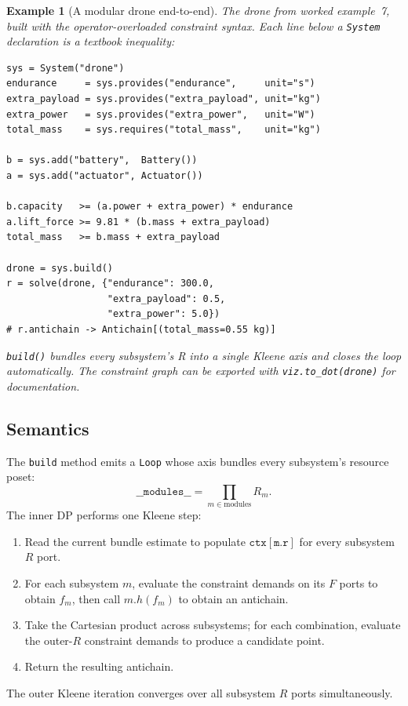 \documentclass[11pt,a4paper]{article}
\newtheorem{example}[definition]{Example}
\begin{document}
\begin{example}[A modular drone end-to-end]
The drone from worked example~7, built with the operator-overloaded
constraint syntax. Each line below a \texttt{System} declaration is
a textbook inequality:
\begin{lstlisting}
sys = System("drone")
endurance     = sys.provides("endurance",     unit="s")
extra_payload = sys.provides("extra_payload", unit="kg")
extra_power   = sys.provides("extra_power",   unit="W")
total_mass    = sys.requires("total_mass",    unit="kg")

b = sys.add("battery",  Battery())
a = sys.add("actuator", Actuator())

b.capacity   >= (a.power + extra_power) * endurance
a.lift_force >= 9.81 * (b.mass + extra_payload)
total_mass   >= b.mass + extra_payload

drone = sys.build()
r = solve(drone, {"endurance": 300.0,
                  "extra_payload": 0.5,
                  "extra_power": 5.0})
# r.antichain -> Antichain[(total_mass=0.55 kg)]
\end{lstlisting}
\texttt{build()} bundles every subsystem's R into a single Kleene
axis and closes the loop automatically. The constraint graph can
be exported with \texttt{viz.to\_dot(drone)} for documentation.
\end{example}

\subsection{Semantics}

The \texttt{build} method emits a \texttt{Loop} whose axis bundles
every subsystem's resource poset:
\[
\texttt{\_\_modules\_\_} =
  \prod_{m \in \mathrm{modules}} R_m.
\]
The inner DP performs one Kleene step:
\begin{enumerate}[leftmargin=2em]
  \item Read the current bundle estimate to populate
        $\mathtt{ctx[m.r]}$ for every subsystem $R$ port.
  \item For each subsystem $m$, evaluate the constraint demands on
        its $F$ ports to obtain $f_m$, then call $m.h(f_m)$ to obtain
        an antichain.
  \item Take the Cartesian product across subsystems; for each
        combination, evaluate the outer-$R$ constraint demands to
        produce a candidate point.
  \item Return the resulting antichain.
\end{enumerate}
The outer Kleene iteration converges over all subsystem $R$ ports
simultaneously.
\end{document}
